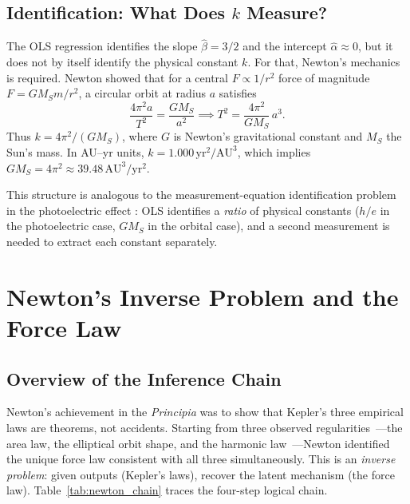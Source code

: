 \documentclass[12pt]{article}
\begin{document}
\subsection{Identification: What Does $k$ Measure?}

The OLS regression identifies the slope $\hat\beta=3/2$ and the
intercept $\hat\alpha\approx0$, but it does not by itself identify
the physical constant $k$.
For that, Newton's mechanics is required.
Newton showed that for a central $F\propto1/r^{2}$ force of magnitude
$F=GM_{S}m/r^{2}$, a circular orbit at radius $a$ satisfies
\[
  \frac{4\pi^{2}a}{T^{2}} = \frac{GM_{S}}{a^{2}}
  \implies T^{2} = \frac{4\pi^{2}}{GM_{S}}\,a^{3}.
\]
Thus $k=4\pi^{2}/(GM_{S})$, where $G$ is Newton's gravitational constant and
$M_{S}$ the Sun's mass.
In AU--yr units, $k=1.000\,\text{yr}^{2}/\text{AU}^{3}$, which implies
$GM_{S}=4\pi^{2}\approx39.48\,\text{AU}^{3}/\text{yr}^{2}$.

This structure is analogous to the measurement-equation identification
problem in the photoelectric effect
\citep[see][Chapter 7]{Casella2002}: OLS identifies a \emph{ratio} of
physical constants ($h/e$ in the photoelectric case, $GM_{S}$ in the
orbital case), and a second measurement is needed to extract each constant
separately.

\section{Newton's Inverse Problem and the Force Law}
\label{sec:newton}

\subsection{Overview of the Inference Chain}

Newton's achievement in the \emph{Principia} \citep{NewtonPrincipia1687}
was to show that Kepler's three empirical laws are theorems, not accidents.
Starting from three observed regularities~---the area law, the elliptical
orbit shape, and the harmonic law~---Newton identified the unique force
law consistent with all three simultaneously.
This is an \emph{inverse problem}: given outputs (Kepler's laws), recover
the latent mechanism (the force law).
Table~\ref{tab:newton_chain} traces the four-step logical chain.
\end{document}
